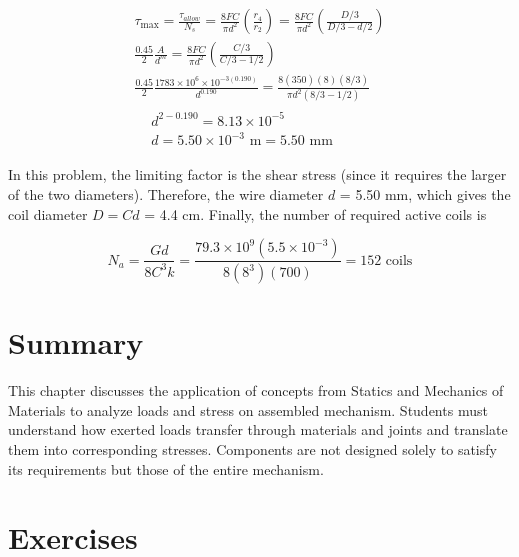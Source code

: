 \documentclass[
10pt,
a4paper,
openany,
svgnames,
]{book}
\begin{document}
\begin{gather*}
  \tau_{\max} = \frac{\tau_{allow}}{N_s} = \frac{8FC}{\pi d^2}\left( \frac{r_4}{r_2} \right) = \frac{8FC}{\pi d^2}\left( \frac{D/3}{D/3 - d/2} \right) \\ 
  \frac{0.45}{2}\frac{A}{d^m} = \frac{8FC}{\pi d^2}\left( \frac{C/3}{C/3 - 1/2} \right) \\ 
  \frac{0.45}{2}\frac{1783 \times 10^6 \times 10^{-3(0.190)}}{d^{0.190}} = \frac{8(350)(8)(8/3)}{\pi d^2(8/3 - 1/2)} \\
  \begin{aligned}
  &d^{2-0.190} = 8.13 \times 10^{-5} \\ 
  &d = 5.50 \times 10^{-3}\text{ m} = 5.50 \text{ mm}
  \end{aligned}
\end{gather*}

In this problem, the limiting factor is the shear stress (since it requires the larger of the two diameters). Therefore, the wire diameter $d$ = 5.50 mm, which gives the coil diameter $D = Cd$ = 4.4 cm. Finally, the number of required active coils is

\[N_a = \frac{Gd}{8C^3k} = \frac{79.3 \times 10^9(5.5 \times 10^{-3})}{8(8^3)(700)} = 152\text{ coils}\]

\section*{Summary}

This chapter discusses the application of concepts from Statics and Mechanics of Materials to analyze loads and stress on assembled mechanism. Students must understand how exerted loads transfer through materials and joints and translate them into corresponding stresses. Components are not designed solely to satisfy its requirements but those of the entire mechanism.

\section*{Exercises}
\end{document}
